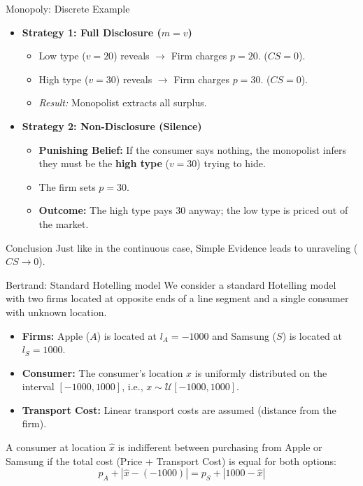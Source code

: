 \documentclass{beamer}
\begin{document}
\begin{frame}{Monopoly: Discrete Example}
    \begin{itemize}
        \item \textbf{Strategy 1: Full Disclosure ($m=v$)}
        \begin{itemize}
            \item Low type ($v=20$) reveals $\rightarrow$ Firm charges $p=20$. ($CS=0$).
            \item High type ($v=30$) reveals $\rightarrow$ Firm charges $p=30$. ($CS=0$).
            \item \textit{Result:} Monopolist extracts all surplus.
        \end{itemize}
        
        \vspace{0.4cm}

        \item \textbf{Strategy 2: Non-Disclosure (Silence)}
        \begin{itemize}
            \item \textbf{Punishing Belief:} If the consumer says nothing, the monopolist infers they must be the \textbf{high type} ($v=30$) trying to hide.
            \item The firm sets $p=30$.
            \item \textbf{Outcome:} The high type pays 30 anyway; the low type is priced out of the market.
        \end{itemize}
    \end{itemize}

    \vspace{0.2cm}
    \begin{block}{Conclusion}
        Just like in the continuous case, Simple Evidence leads to unraveling ($CS \to 0$).
    \end{block}
\end{frame}

\begin{frame}{Bertrand: Standard Hotelling model}\label{BB}
    We consider a standard Hotelling model with two firms located at opposite ends of a line segment and a single consumer with unknown location.

\begin{itemize}
    \item \textbf{Firms:} Apple ($A$) is located at $l_A = -1000$ and Samsung ($S$) is located at $l_S = 1000$.
    \item \textbf{Consumer:} The consumer's location $x$ is uniformly distributed on the interval $[-1000, 1000]$, i.e., $x \sim \mathcal{U}[-1000, 1000]$.
    \item \textbf{Transport Cost:} Linear transport costs are assumed (distance from the firm).
\end{itemize}

A consumer at location $\hat{x}$ is indifferent between purchasing from Apple or Samsung if the total cost (Price + Transport Cost) is equal for both options:
\begin{equation}
    p_A + |\hat{x} - (-1000)| = p_S + |1000 - \hat{x}|
\end{equation}
\end{frame}
\end{document}
